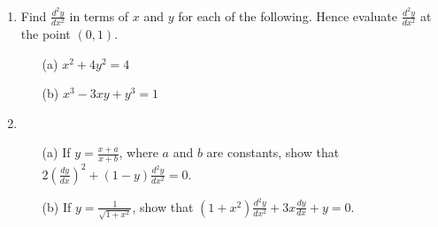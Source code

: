 \documentclass[12pt]{article}
\newcommand{\ds}{\displaystyle}
\begin{document}
\begin{enumerate}
\item
Find $\ds \frac{d^2 y}{dx^2}$ in terms of $x$ and $y$ for each of the following. Hence evaluate $\ds \frac{d^2 y}{dx^2}$ at the point $(0,1)$.
\begin{enumerate}
\item[(a)]
$x^2 + 4y^2 = 4$
\item[(b)]
$x^3 - 3xy + y^3 = 1$
\end{enumerate}

\item
\begin{enumerate}
\item[(a)]
If $\ds y = \frac{x+a}{x+b}$, where $a$ and $b$ are constants, show that $\ds 2\left(\frac{dy}{dx}\right)^2 + (1-y)\frac{d^2 y}{dx^2} = 0$.
\item[(b)]
If $\displaystyle y = \frac{1}{\sqrt{1 + x^2}}$, show that $\ds \left(1 + x^2\right)\frac{d^2 y}{dx^2} + 3x\frac{dy}{dx} + y = 0$.
\end{enumerate}





\end{enumerate}
\end{document}

